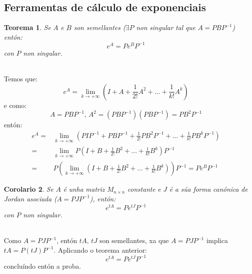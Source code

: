 \documentclass[11pt, a4paper,twoside]{article}
\makeatletter
\theoremstyle{theorem-style}  %
\newtheorem{theorem}{Teorema}[section]  %
\newtheorem{corollary}[theorem]{Corolario} %
\renewenvironment{proof}[1][\proofname]{\par
	\pushQED{\qed}%
	\normalfont \topsep6\p@\@plus6\p@\relax
	\list{}{%
		\settowidth{\leftmargin}{\quad:\hskip\labelsep}%
		\setlength{\labelwidth}{0pt}%
		\setlength{\itemindent}{-\leftmargin}%
	}%
	\item[\hskip\labelsep\itshape#1\@addpunct{:}]\ignorespaces
}{%
	\popQED\endlist\@endpefalse
}
\theoremstyle{definition-style}
\theoremstyle{example-style}
\makeatother
\begin{document}
\subsection{Ferramentas de cálculo de exponenciais}
\begin{theorem}
	Se $A$ e $B$ son semellantes ($\exists P$ non singular tal que $A = PBP^{-1}$) entón:
	\[e^A = Pe^BP^{-1}\]
	con $P$ non singular.
\end{theorem}
\begin{proof} \ \\
	Temos que:
	\[e^A = \lim\limits_{k \to +\infty} (I + A + \frac{1}{2!}A^2 + \dots + \frac{1}{k!}A^k)\]
	e como:
	\[A = PBP^{-1} \text{, } A^2 = (PBP^{-1})(PBP^{-1}) = PB^2P^{-1}\]
	entón:
	\begin{align*}
		e^A =& \lim\limits_{k \to +\infty} (PIP^{-1} + PBP^{-1} + \frac{1}{2!}PB^2P^{-1} + \dots + \frac{1}{k!}PB^kP^{-1}) \\
		=& \lim\limits_{k \to +\infty} P(I + B + \frac{1}{2!}B^2 + \dots + \frac{1}{k!}B^k)P^{-1} \\
		=& P(\lim\limits_{k \to +\infty} (I + B + \frac{1}{2!}B^2 + \dots + \frac{1}{k!}B^k))P^{-1} = Pe^BP^{-1}
	\end{align*}
\end{proof}
\begin{corollary}
	Se $A$ é unha matriz $M_{n \times n}$ constante e $J$ é a súa forma canónica de Jordan asociada ($A=PJP^{-1}$), entón:
	\[e^{tA} = Pe^{tJ}P^{-1}\]
	con $P$ non singular.
\end{corollary}
\begin{proof}\ \\
	Como $A=PJP^{-1}$, entón $tA$, $tJ$ son semellantes, xa que $A=PJP^{-1}$ implica $tA=P(tJ)P^{-1}$. Aplicando o teorema anterior:
	\[e^{tA} = Pe^{tJ}P^{-1}\]
	concluíndo entón a proba.
\end{proof}
\end{document}
